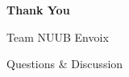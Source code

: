 \documentclass[xcolor=table,dvipsnames,svgnames,aspectratio=169]{beamer}
\begin{document}
\begin{frame}{\mbox{}}
\centering
\vfill
{\Huge\textcolor{cprimary}{\textbf{Thank You}}}\par
\vspace{1.0em}
{\large Team NUUB \quad\textbar\quad Envoix}\par
\vspace{0.4em}
{\normalsize Questions \& Discussion}
\vfill
\end{frame}
\end{document}
